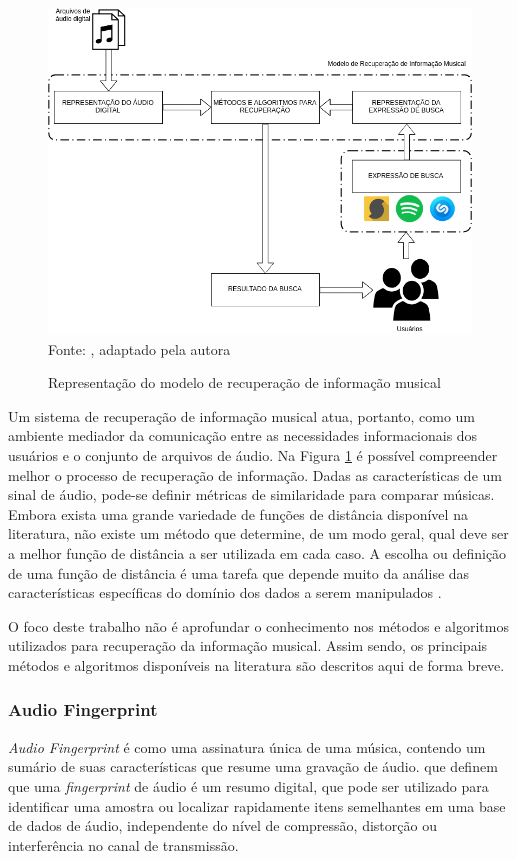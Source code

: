 \begin{figure}[!htb]
   \centering
   \caption{Representação do modelo de recuperação de informação musical} 
   \label{fig:modeloRecInfo} 
   \includegraphics[scale=0.47]{figuras/modeloRecInfo.png}
   \\Fonte: \cite{ferreira2015}, adaptado pela autora
\end{figure}

Um sistema de recuperação de informação musical atua, portanto, como um ambiente mediador da comunicação entre as necessidades informacionais dos usuários e o conjunto de arquivos de áudio. Na Figura \ref{fig:modeloRecInfo} é possível compreender melhor o processo de recuperação de informação. Dadas as características de um sinal de áudio, pode-se definir métricas de similaridade para comparar músicas. Embora exista uma grande variedade de funções de distância disponível na literatura, não existe um método que determine, de um modo geral, qual deve ser a melhor função de distância a ser utilizada em cada caso. A escolha ou definição de uma função de distância é uma tarefa que depende muito da análise das características específicas do domínio dos dados a serem manipulados \cite{barioni2006}.

O foco deste trabalho não é aprofundar o conhecimento nos métodos e algoritmos utilizados para recuperação da informação musical. Assim sendo, os principais métodos e algoritmos disponíveis na literatura são descritos aqui de forma breve.

\subsubsection{Audio Fingerprint} \label{subsubsec:audioFingerprint}
\textit{Audio Fingerprint} é como uma assinatura única de uma música, contendo um sumário de suas características que resume uma gravação de áudio.  que definem que uma \textit{fingerprint} de áudio é um resumo digital, que pode ser utilizado para identificar uma amostra ou localizar rapidamente itens semelhantes em uma base de dados de áudio, independente do nível de compressão, distorção ou interferência no canal de transmissão.

